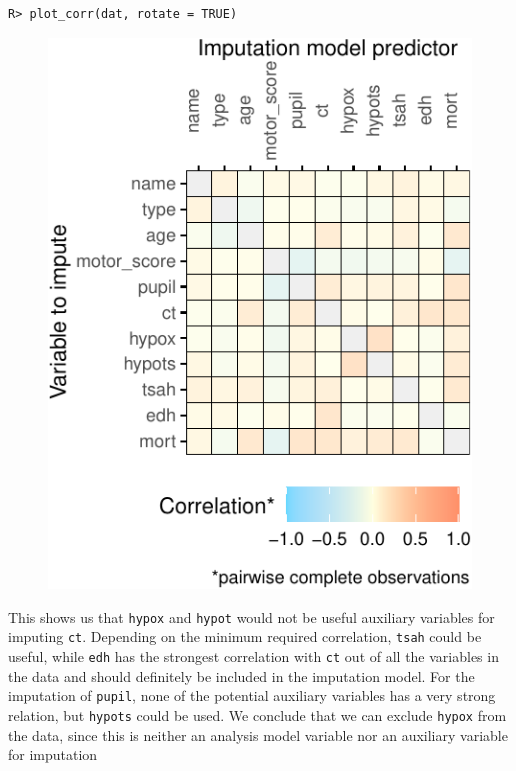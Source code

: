 \documentclass[
  article]{jss}
\begin{document}
\begin{verbatim}
R> plot_corr(dat, rotate = TRUE)
\end{verbatim}

\begin{figure}[h]

{\centering \includegraphics{manuscript_files/figure-pdf/unnamed-chunk-28-1.pdf}

}

\end{figure}

This shows us that \texttt{hypox} and \texttt{hypot} would not be useful
auxiliary variables for imputing \texttt{ct}. Depending on the minimum
required correlation, \texttt{tsah} could be useful, while \texttt{edh}
has the strongest correlation with \texttt{ct} out of all the variables
in the data and should definitely be included in the imputation model.
For the imputation of \texttt{pupil}, none of the potential auxiliary
variables has a very strong relation, but \texttt{hypots} could be used.
We conclude that we can exclude \texttt{hypox} from the data, since this
is neither an analysis model variable nor an auxiliary variable for
imputation
\end{document}
